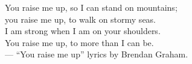 
\noindent You raise me up, so I can stand on mountains;\\
you raise me up, to walk on stormy seas.\\
I am strong when I am on your shoulders.\\
You raise me up, to more than I can be.\\
--- ``You raise me up'' lyrics by Brendan Graham.\\
